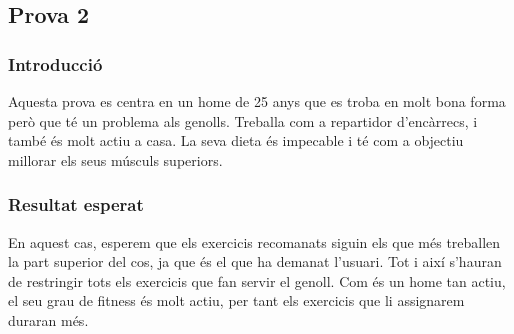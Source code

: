 \documentclass[a4paper, 12pt, UTF8]{article}
\begin{document}
\subsection{Prova 2}
\subsubsection{Introducció}
Aquesta prova es centra en un home de 25 anys que es troba en molt bona forma però que té un problema als genolls. Treballa com a repartidor d'encàrrecs, i també és molt actiu a casa. La seva dieta és impecable i té com a objectiu millorar els seus músculs superiors.
\subsubsection{Resultat esperat}
En aquest cas, esperem que els exercicis recomanats siguin els que més treballen la part superior del cos, ja que és el que ha demanat l'usuari. Tot i així s'hauran de restringir tots els exercicis que fan servir el genoll. Com és un home tan actiu, el seu grau de fitness és molt actiu, per tant els exercicis que li assignarem duraran més.
\end{document}
